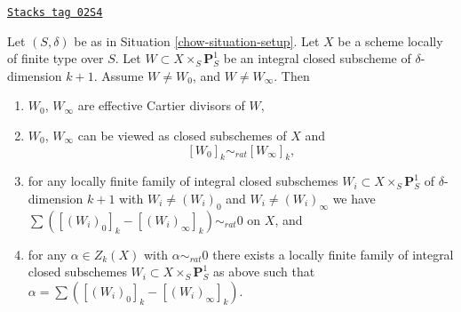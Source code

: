 \begin{lemma}
\label{chow-lemma-rational-equivalence-family}
\href{https://stacks.math.columbia.edu/tag/02S4}{\texttt{Stacks tag 02S4}}

Let $(S, \delta)$ be as in Situation \ref{chow-situation-setup}.
Let $X$ be a scheme locally of finite type over $S$.
Let $W \subset X \times_S \mathbf{P}^1_S$ be an integral
closed subscheme of $\delta$-dimension $k + 1$.
Assume $W \not = W_0$, and $W \not = W_\infty$. Then
\begin{enumerate}
\item $W_0$, $W_\infty$ are effective Cartier divisors of $W$,
\item $W_0$, $W_\infty$ can be viewed as closed subschemes
of $X$ and
$$
[W_0]_k \sim_{rat} [W_\infty]_k,
$$
\item for any locally finite family of
integral closed subschemes
$W_i \subset X \times_S \mathbf{P}^1_S$
of $\delta$-dimension $k + 1$ with $W_i \not = (W_i)_0$ and
$W_i \not = (W_i)_\infty$ we have
$\sum ([(W_i)_0]_k - [(W_i)_\infty]_k) \sim_{rat} 0$
on $X$, and
\item for any $\alpha \in Z_k(X)$ with $\alpha \sim_{rat} 0$
there exists a locally finite family of
integral closed subschemes $W_i \subset X \times_S \mathbf{P}^1_S$
as above such that $\alpha = \sum ([(W_i)_0]_k - [(W_i)_\infty]_k)$.
\end{enumerate}
\end{lemma}

